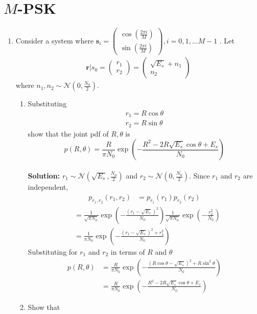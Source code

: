\documentclass[journal,8pt,onecolumn]{IEEEtran}
\providecommand{\brak}[1]{\ensuremath{\left(#1\right)}}
\newcommand{\solution}{\noindent \textbf{Solution: }}
\newcommand{\myvec}[1]{\ensuremath{\begin{pmatrix}#1\end{pmatrix}}}
\providecommand{\gauss}[2]{\mathcal{N}\ensuremath{\left(#1,#2\right)}}
\begin{document}
\section{$M$-PSK}
\begin{enumerate}

\item
Consider a system where 
$\mathbf{s}_i=
\myvec{
\cos\brak{\frac{2\pi i}{M}}\\
\sin\brak{\frac{2\pi i}{M}}
}, i = 0, 1 , \dots M-1
$
.
Let
%
\begin{align}
\mathbf{r}|s_0 = 
\myvec{
r_1\\
r_2
}
=
\myvec{
\sqrt{E_s}+n_1\\
n_2
}
\end{align}
where $n_1,n_2 \sim \mathcal{N}\brak{0,\frac{N_0}{2}}$.

\begin{enumerate}[label=(\alph{enumii})]
\item Substituting 
\label{prob:mpsk_polar_joint_pdf}
\begin{align}
r_1=R\cos \theta \\
r_2=R\sin \theta
\end{align}
show that the joint pdf of $R,\theta$ is
%
\begin{equation}
p\brak{R,\theta}=\frac{R}{\pi N_0}\exp\brak{-\frac{R^2-2R\sqrt{E_s}\cos \theta + E_s}{N_0}}
\label{eq:mpsk_joint_pdf_polar}
\end{equation}\\
\solution $r_1 \sim \gauss{\sqrt{E_s}}{\frac{N_0}{2}}$ and $r_2 \sim \gauss{0}{\frac{N_0}{2}}$. Since $r_1$ and $r_2$ are independent,
\begin{align*}
	p_{r_1,r_2}(r_1,r_2) &= p_{r_1}(r_1)p_{r_2}(r_2)
\end{align*}
\begin{align*}
	&= \frac{1}{\sqrt{\pi N_0}}\exp\left(-\frac{(r_1-\sqrt{E_s})^2}{N_0}\right)\frac{1}{\sqrt{\pi N_0}}\exp\left(-\frac{r_2^2}{N_0}\right)\\
	&= \frac{1}{\pi N_0}\exp\left(-\frac{(r_1-\sqrt{E_s})^2+r_2^2}{N_0}\right)
\end{align*}
Substituting for $r_1$ and $r_2$ in terms of $R$ and $\theta$
\begin{align*}
	p\brak{R,\theta} &= \frac{R}{\pi N_0}\exp\left(-\frac{(R\cos\theta - \sqrt{E_s})^2+R\sin^2\theta}{N_0}\right)\\
	&= \frac{R}{\pi N_0}\exp\brak{-\frac{R^2-2R\sqrt{E_s}\cos \theta + E_s}{N_0}}
\end{align*}
%
\item Show that 

\end{enumerate}
\end{enumerate}
\end{document}
